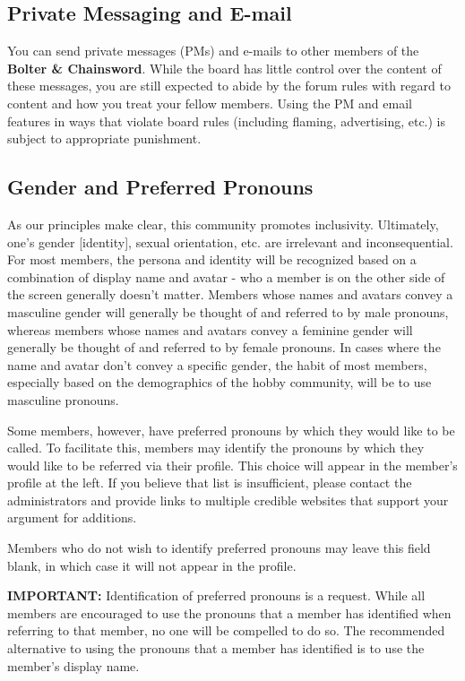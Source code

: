 \documentclass[12pt]{article}
\newcommand{\bnc}{{\textbf{Bolter \& Chainsword}}}%
\begin{document}
\subsection{Private Messaging and E-mail}

You can send private messages (PMs) and e-mails to other members of the 
{\bnc}. While the board has little control over the 
content of these messages, you are still expected to abide by the forum 
rules with regard to content and how you treat your fellow members. 
Using the PM and email features in ways that violate board rules 
(including flaming, advertising, etc.) is subject to appropriate 
punishment.

\subsection{Gender and Preferred Pronouns}

As our principles make clear, this community promotes inclusivity. 
Ultimately, one's gender [identity], sexual orientation, etc. are 
irrelevant and inconsequential. For most members, the persona and 
identity will be recognized based on a combination of display name and 
avatar - who a member is on the other side of the screen generally 
doesn't matter. Members whose names and avatars convey a masculine 
gender will generally be thought of and referred to by male pronouns, 
whereas members whose names and avatars convey a feminine gender will 
generally be thought of and referred to by female pronouns. In cases 
where the name and avatar don't convey a specific gender, the habit of 
most members, especially based on the demographics of the hobby 
community, will be to use masculine pronouns.

Some members, however, have preferred pronouns by which they would like 
to be called. To facilitate this, members may identify the pronouns by 
which they would like to be referred via their profile. This choice 
will appear in the member's profile at the left. If you believe that 
list is insufficient, please contact the administrators and provide 
links to multiple credible websites that support your argument for 
additions.

Members who do not wish to identify preferred pronouns may leave this 
field blank, in which case it will not appear in the profile.

{\textbf{IMPORTANT:}} Identification of preferred pronouns is a request. While all 
members are encouraged to use the pronouns that a member has identified 
when referring to that member, no one will be compelled to do so. The 
recommended alternative to using the pronouns that a member has 
identified is to use the member's display name.
\end{document}

